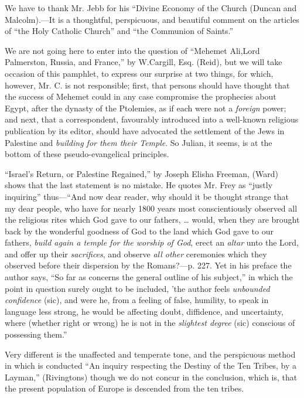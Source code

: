 We have to thank Mr. Jebb for his ``Divine Economy
of the Church (Duncan and Malcolm).—It is a thoughtful, perspicuous,
and beautiful comment on the articles of ``the Holy Catholic Church'' and ``the
Communion of Saints.''

We are not going here to enter into the question of
``Mehemet Ali,\emph{}Lord Palmerston, Russia, and France,'' by W.\emph{}Cargill, Esq. (Reid),
but we will take occasion of this pamphlet, to express our surprise at
two things, for which, however, Mr. C. is not responsible; first, that
persons should have thought that the success of Mehemet could in any
case compromise the prophecies about Egypt, after the dynasty of the
Ptolemies, as if each were not a \emph{foreign} power; and next, that a
correspondent, favourably introduced into a well-known religious
publication by its editor, should have advocated the settlement of the
Jews in Palestine and \emph{building for them their Temple}. So Julian, it seems, is at the bottom of these
pseudo-evangelical principles.

``Israel's Return, or Palestine Regained,'' by Joseph
Elisha Freeman, (Ward) shows that the last statement is no mistake. He
quotes Mr. Frey as ``justly inquiring'' thus—``And now dear reader, why
should it be thought strange that my dear people, who have for nearly
1800 years most conscientiously observed all the religious rites which
God gave to our fathers, … would, when they are brought back by the
wonderful goodness of God to the land which God gave to our fathers, \emph{build
again a temple for the worship of God},
erect an \emph{altar} unto the Lord, and offer up their \emph{sacrifices},
and observe \emph{all other} ceremonies which they observed before their
dispersion by the Romans?—p. 227. Yet in his preface the author says, ``So
far as concerns the general outline of his subject,'' in which the point
in question surely ought to be included, 'the author feels \emph{unbounded
confidence} (sic), and were he, from a feeling of false, humility, to
speak in language less strong, he would be affecting doubt, diffidence,
and uncertainty, where (whether right or wrong) he is not in the \emph{slightest
degree} (sic) conscious of possessing them.''

Very different is the unaffected and temperate
tone, and the perspicuous method in which is conducted ``An inquiry
respecting the Destiny of the Ten Tribes, by a Layman,'' (Rivingtons)
though we do not concur in the conclusion, which is, that the present
population of Europe is descended from the ten tribes.

